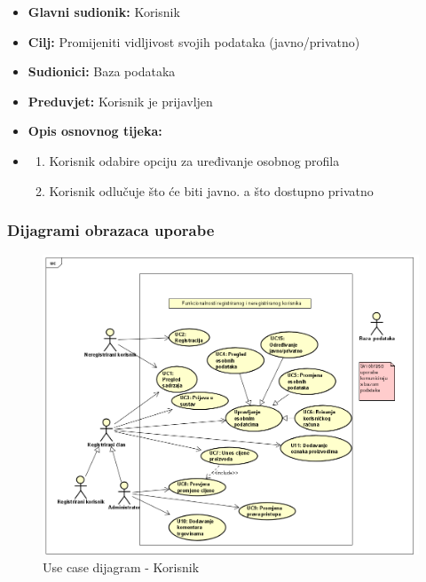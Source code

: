 					
					\noindent {}
					\begin{itemize}
	
						\item \textbf{Glavni sudionik: }Korisnik
						\item  \textbf{Cilj:} Promijeniti vidljivost svojih podataka (javno/privatno)
						\item  \textbf{Sudionici:} Baza podataka
						\item  \textbf{Preduvjet:} Korisnik je prijavljen
						\item  \textbf{Opis osnovnog tijeka:}
						
						\item[] \begin{enumerate}
							\item Korisnik odabire opciju za uređivanje osobnog profila
                                \item Korisnik odlučuje što će biti javno. a što dostupno privatno\\
						\end{enumerate}

					\end{itemize}

                    

                        


     
					
				\subsubsection{Dijagrami obrazaca uporabe}
					
					\begin{figure}[H]
			\includegraphics[width=\textwidth]{slike/Korisnik.PNG} %
			\caption{Use case dijagram - Korisnik}
			\label{fig:Korisnik} %
			\end{figure}
			
